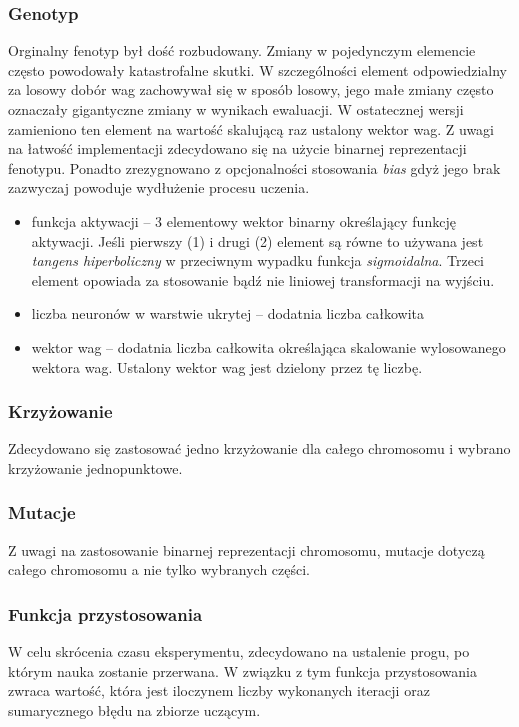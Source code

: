 \documentclass{llncs}
\begin{document}
\subsubsection{Genotyp}
Orginalny fenotyp był dość rozbudowany. Zmiany w pojedynczym elemencie często powodowały katastrofalne skutki.
W szczególności element odpowiedzialny za losowy dobór wag zachowywał się w sposób losowy, jego małe zmiany
często oznaczały gigantyczne zmiany w wynikach ewaluacji. W ostatecznej wersji zamieniono ten element na 
wartość skalującą raz ustalony wektor wag.
Z uwagi na łatwość implementacji zdecydowano się na użycie binarnej reprezentacji fenotypu. 
Ponadto zrezygnowano z opcjonalności stosowania \emph{bias} gdyż jego brak zazwyczaj
powoduje wydłużenie procesu uczenia.
\begin{itemize}
	\item funkcja aktywacji -- 3 elementowy wektor binarny określający funkcję aktywacji. Jeśli pierwszy (1) i 
	drugi (2) element są równe to używana jest \emph{tangens hiperboliczny} w przeciwnym wypadku funkcja \emph{sigmoidalna}.
	Trzeci element opowiada za stosowanie bądź nie liniowej transformacji na wyjściu.
	\item liczba neuronów w warstwie ukrytej -- dodatnia liczba całkowita
	\item wektor wag -- dodatnia liczba całkowita określająca skalowanie wylosowanego wektora wag.
	Ustalony wektor wag jest dzielony przez tę liczbę.
\end{itemize}

\subsubsection{Krzyżowanie}
Zdecydowano się zastosować jedno krzyżowanie dla całego chromosomu i wybrano krzyżowanie
jednopunktowe.

\subsubsection{Mutacje}
Z uwagi na zastosowanie binarnej reprezentacji chromosomu, mutacje dotyczą całego chromosomu 
a nie tylko wybranych części.

\subsubsection{Funkcja przystosowania}
W celu skrócenia czasu eksperymentu, zdecydowano na ustalenie progu, po którym nauka zostanie przerwana.
W związku z tym funkcja przystosowania zwraca wartość, która jest iloczynem
liczby wykonanych iteracji oraz sumarycznego błędu na zbiorze uczącym.
\end{document}
